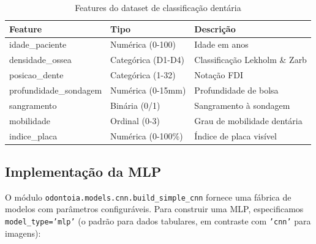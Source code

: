 \begin{table}[H]
  \centering
  \caption{Features do dataset de classificação dentária}
  \label{tab:features-mlp}
  \begin{tabularx}{\textwidth}{llX}
    \toprule
    \textbf{Feature} & \textbf{Tipo} & \textbf{Descrição} \\
    \midrule
    idade\_paciente & Numérica (0-100) & Idade em anos \\
    densidade\_ossea & Categórica (D1-D4) & Classificação Lekholm \& Zarb \\
    posicao\_dente & Categórica (1-32) & Notação FDI \\
    profundidade\_sondagem & Numérica (0-15mm) & Profundidade de bolsa \\
    sangramento & Binária (0/1) & Sangramento à sondagem \\
    mobilidade & Ordinal (0-3) & Grau de mobilidade dentária \\
    indice\_placa & Numérica (0-100\%) & Índice de placa visível \\
    \bottomrule
  \end{tabularx}
\end{table}

\subsection{Implementação da MLP}

O módulo \texttt{odontoia.models.cnn.build\_simple\_cnn} fornece uma fábrica
de modelos com parâmetros configuráveis. Para construir uma MLP, especificamos
\texttt{model\_type='mlp'} (o padrão para dados tabulares, em contraste com
\texttt{'cnn'} para imagens):

